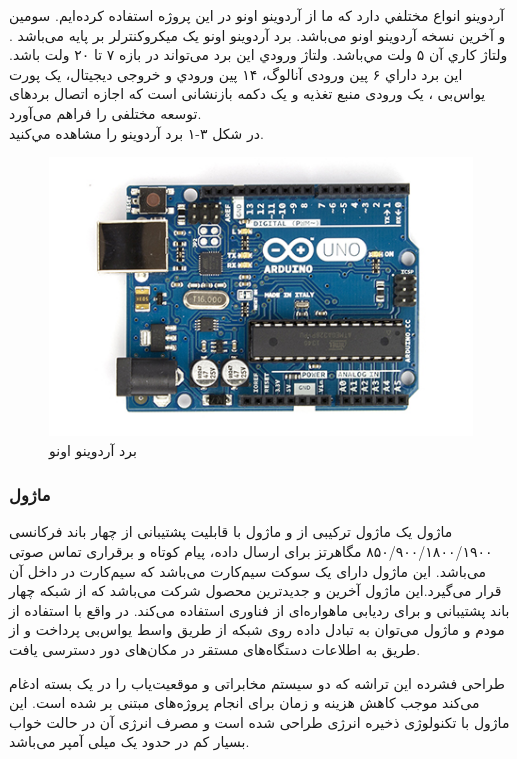 آردوينو انواع مختلفي دارد كه ما از آردوینو اونو در این پروژه استفاده کرده‌ایم.  سومین و آخرین نسخه آردوینو اونو می‌باشد. برد آردوینو اونو یک میکروکنترلر بر پایه  می‌باشد \cite{Agrawal2018}. ولتاژ كاري آن ۵ ولت مي‌باشد. ولتاژ ورودي این برد می‌تواند در بازه ۷ تا ۲۰ ولت باشد. این برد داراي ۶ پین ورودی آنالوگ، ۱۴ پين ورودي و خروجی ديجيتال، یک پورت یواس‌بی  ، یک ورودی منبع تغذیه و یک دکمه بازنشانی  است که اجازه اتصال بردهای توسعه مختلفی را فراهم می‌آورد. \\
در شكل ۳-۱ برد آردوينو  را مشاهده مي‌كنيد.
\begin{figure}[!h]
	\centerline{\includegraphics[width=.6\textwidth]{ArduinoUno_R3}}
	\caption{برد آردوینو اونو}
\end{figure}
\subsubsection{ماژول }

ماژول  یک ماژول ترکیبی از  و ماژول  با قابلیت پشتیبانی از چهار باند فرکانسی ۸۵۰/۹۰۰/۱۸۰۰/۱۹۰۰ مگاهرتز برای ارسال داده، پیام کوتاه و برقراری تماس صوتی می‌باشد. این ماژول دارای یک سوکت سیم‌کارت می‌باشد که سیم‌کارت در داخل آن قرار می‌گیرد.این ماژول آخرین و جدیدترین محصول شرکت  می‌باشد که از شبکه چهار باند  پشتیبانی و برای ردیابی ماهواره‌ای از فناوری  استفاده می‌کند. در واقع با استفاده از مودم  و ماژول  می‌توان به تبادل داده روی شبکه  از طریق واسط یو‌اس‌بی پرداخت و از طریق به اطلاعات دستگاه‌های مستقر در مکان‌های دور دسترسی یافت.

طراحی فشرده این تراشه که دو سیستم مخابراتی و موقعیت‌یاب را در یک بسته ادغام می‌کند موجب کاهش هزینه و زمان برای انجام پروژه‌های مبتنی بر  شده است. این ماژول با تکنولوژی ذخیره انرژی  طراحی شده است و مصرف انرژی آن در حالت خواب بسیار کم در حدود یک میلی آمپر می‌باشد.
 

